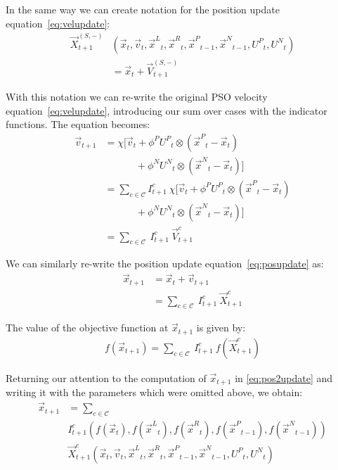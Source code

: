 \documentclass[journal,letterpaper]{IEEEtran}
\providecommand{\pers}{\ensuremath{P}}
\providecommand{\neigh}{\ensuremath{N}}
\providecommand{\leftind}{\ensuremath{L}}
\providecommand{\rightind}{\ensuremath{R}}
\providecommand{\nURand}{\ensuremath{U^\neigh}}
\providecommand{\pURand}{\ensuremath{U^\pers}}
\providecommand{\ppos}{\ensuremath{\Vec{x}}}
\providecommand{\pvel}{\ensuremath{\Vec{v}}}
\providecommand{\nbest}{\ensuremath{\Vec{x}^\neigh}}
\providecommand{\pbest}{\ensuremath{\Vec{x}^\pers}}
\providecommand{\constriction}{\ensuremath{\chi}}
\providecommand{\ncoeff}{\ensuremath{\phi^\neigh}}
\providecommand{\pcoeff}{\ensuremath{\phi^\pers}}
\providecommand{\ofunc}{\ensuremath{f}}
\providecommand{\indic}{\ensuremath{I}}
\providecommand{\specvel}{\ensuremath{\vec{V}}}
\providecommand{\specpos}{\ensuremath{\vec{X}}}
\providecommand{\leftn}{\ensuremath{\Vec{x}^\leftind}}
\providecommand{\rightn}{\ensuremath{\Vec{x}^\rightind}}
\providecommand{\caseset}{\ensuremath{\mathcal{C}}}
\providecommand{\casexn}{\ensuremath{(S,-)}}
\begin{document}
In the same way we can create notation for the position update
equation~\eqref{eq:velupdate}:
\begin{align}
\label{eq:defpcasexn}
	\specpos_{t+1}^{\casexn} & (\ppos_{t}, \pvel_{t}, \leftn_{t},
	\rightn_{t} ,\pbest_{t-1} ,\nbest_{t-1}, \pURand_{t}, \nURand_{t}) \\
\nonumber
	& = \ppos_{t} + \specvel_{t+1}^{\casexn}
\end{align}

With this notation we can re-write the original PSO velocity
equation~\eqref{eq:velupdate}, introducing our sum over cases with the
indicator functions.  The equation becomes:
\begin{align}
\nonumber
	\pvel_{t+1} &=
		\constriction \bigl[ \pvel_t
			+ \pcoeff\pURand_{t}\otimes(\pbest_{t} - \ppos_{t}) \\
\nonumber
			& \quad \quad \quad \, + \ncoeff\nURand_{t}\otimes(\nbest_{t} -
			\ppos_{t}) \bigr] \\
\nonumber
	&= \sum_{c \in \caseset} \indic_{t+1}^{c} \ \constriction \bigl[ \pvel_t
			+ \pcoeff\pURand_{t}\otimes(\pbest_{t} - \ppos_{t}) \\
\nonumber
			& \quad \quad \quad \, + \ncoeff\nURand_{t}\otimes(\nbest_{t} -
			\ppos_{t}) \bigr]  \\
\label{eq:vel2update}
	&= \sum_{c \in \caseset} \ \indic_{t+1}^{c} \ \specvel_{t+1}^{c} 
\end{align}

We can similarly re-write the position update equation~\eqref{eq:posupdate} as:
\begin{align}
\nonumber
	\ppos_{t+1} &= \ppos_{t} + \pvel_{t+1} \\
\label{eq:pos2update}
	&= \sum_{c \in \caseset} \ \indic_{t+1}^{c} \ \specpos_{t+1}^{c} 
\end{align}

The value of the objective function at $\ppos_{t+1}$ is given by:
\begin{align}
\label{eq:val2update}
	\ofunc (\ppos_{t+1}) = \sum_{c \in \caseset} \ \indic_{t+1}^{c}
	\ \ofunc(\specpos_{t+1}^{c})
\end{align}

Returning our attention to the computation of $\ppos_{t+1}$ in
\eqref{eq:pos2update} and writing it with the parameters which were omitted
above, we obtain:
\begin{align}
\nonumber
  \ppos_{t+1} &= \sum_{c \in \caseset} \\
\nonumber
	& \indic_{t+1}^{c}(\ofunc ( \ppos_{t} ) ,\ofunc(\leftn_{t}),
	\ofunc(\rightn_{t}) ,\ofunc(\pbest_{t-1}) ,\ofunc(\nbest_{t-1})) \\
\label{eq:val2updatelong}
	& \specpos_{t+1}^{c}(\ppos_{t},\pvel_{t},\leftn_{t},\rightn_{t},
	\pbest_{t-1},\nbest_{t-1},\pURand_{t}, \nURand_{t})
\end{align}
\end{document}
